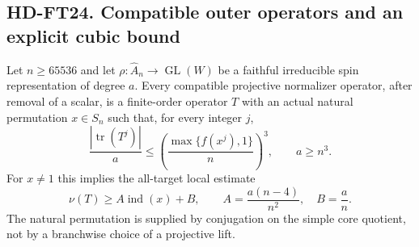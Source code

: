 \subsection*{HD-FT24. Compatible outer operators and an explicit cubic bound}

\begin{lemma}[HD-FT24]
Let $n\ge65536$ and let $\rho:\widehat A_n\to\operatorname{GL}(W)$
be a faithful irreducible spin representation of degree $a$.
Every compatible projective normalizer operator, after removal of
a scalar, is a finite-order operator $T$ with an actual natural
permutation $x\in S_n$ such that, for every integer $j$,
\[
 \frac{|\operatorname{tr}(T^j)|}{a}
 \le \left(\frac{\max\{f(x^j),1\}}n\right)^3,
 \qquad a\ge n^3.
 \tag{SPA.8}
\]
For $x\ne1$ this implies the all-target local estimate
\[
 \nu(T)\ge A\operatorname{ind}(x)+B,
 \qquad
 A=\frac{a(n-4)}{n^2},\quad B=\frac an.
 \tag{SPA.9}
\]
The natural permutation is supplied by conjugation on the simple
core quotient, not by a branchwise choice of a projective lift.
\end{lemma}

